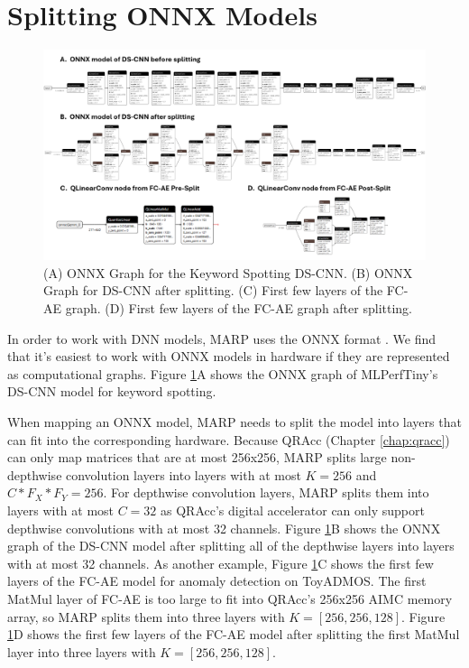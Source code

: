 \section{Splitting ONNX Models}

\begin{figure}[htbp]
    \centering
    \includegraphics[width=\textwidth]{images/marp/onnx_and_splitting.png}
    \caption{(A) ONNX Graph for the Keyword Spotting DS-CNN. (B) ONNX Graph for DS-CNN after splitting. (C) First few layers of the FC-AE graph. (D) First few layers of the FC-AE graph after splitting. }
    \label{fig:onnx}
\end{figure}

In order to work with DNN models, MARP uses the ONNX format \cite{onnxruntime}. We find that it's easiest to work with ONNX models in hardware if they are represented as computational graphs. Figure \ref{fig:onnx}A shows the ONNX graph of MLPerfTiny's DS-CNN model for keyword spotting.

When mapping an ONNX model, MARP needs to split the model into layers that can fit into the corresponding hardware. Because QRAcc (Chapter \ref{chap:qracc}) can only map matrices that are at most 256x256, MARP splits large non-depthwise convolution layers into layers with at most $K=256$ and $C*F_X*F_Y=256$. For depthwise convolution layers, MARP splits them into layers with at most $C=32$ as QRAcc's digital accelerator can only support depthwise convolutions with at most 32 channels. Figure \ref{fig:onnx}B shows the ONNX graph of the DS-CNN model after splitting all of the depthwise layers into layers with at most 32 channels. As another example, Figure \ref{fig:onnx}C shows the first few layers of the FC-AE model for anomaly detection on ToyADMOS. The first MatMul layer of FC-AE is too large to fit into QRAcc's 256x256 AIMC memory array, so MARP splits them into three layers with $K=[256,256,128]$. Figure \ref{fig:onnx}D shows the first few layers of the FC-AE model after splitting the first MatMul layer into three layers with $K=[256,256,128]$. 

